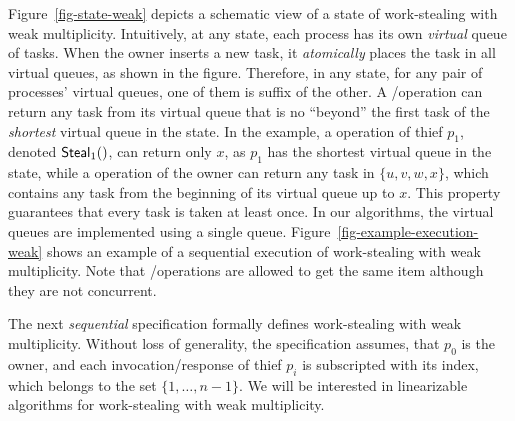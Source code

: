 Figure~\ref{fig-state-weak} depicts a schematic view of a state of work-stealing with weak multiplicity.  Intuitively, at any state, each process has its own \emph{virtual} queue of tasks.  When the owner inserts a new task, it \emph{atomically} places the task in all virtual queues, as shown in the figure.  Therefore, in any state, for any pair of processes' virtual queues, one of them is suffix of the other.  A \Take/\Steal operation can return any task from its virtual queue that is no ``beyond'' the first task of the \emph{shortest} virtual queue in the state. In the example, a \Steal operation of thief $p_1$, denoted ${\sf \small Steal}_1()$, can return only $x$, as $p_1$ has the shortest virtual queue in the state, while a \Take operation of the owner can return any task in $\{u,v,w,x\}$, which contains any task from the beginning of its virtual queue up to $x$.  This property guarantees that every task is taken at least once.  In our algorithms, the virtual queues are implemented using a single queue.  Figure~\ref{fig-example-execution-weak} shows an example of a sequential execution of work-stealing with weak multiplicity. Note that \Take/\Steal operations are allowed to get the same item although they are not concurrent.

The next \emph{sequential} specification formally defines work-stealing with weak multiplicity.  Without loss of generality, the specification assumes, that \(p_0\) is the owner, and each invocation/response of thief \(p_i\) is subscripted with its index, which belongs to the set \(\{1, \hdots, n-1\}\).  We will be interested in linearizable algorithms for work-stealing with weak multiplicity.


